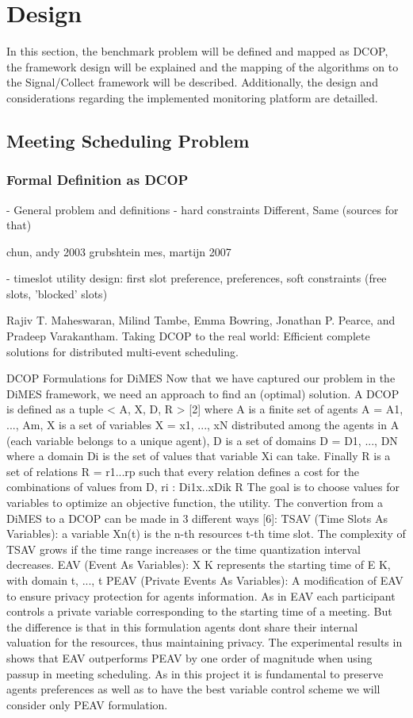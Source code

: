 \chapter{Design}

In this section, the benchmark problem will be defined and mapped as DCOP, the framework design will be explained and the mapping of the algorithms on to the Signal/Collect framework will be described. Additionally, the design and considerations regarding the implemented monitoring platform are detailled.

\section{Meeting Scheduling Problem}

\subsection{Formal Definition as DCOP}

- General problem and definitions
- hard constraints Different, Same (sources for that)

\cite{Chapman2011}
chun, andy 2003
grubshtein
mes, martijn 2007


- timeslot utility design: first slot preference, preferences, soft constraints (free slots, 'blocked' slots)

Rajiv T. Maheswaran, Milind Tambe, Emma Bowring, Jonathan P. Pearce, and Pradeep Varakantham. Taking DCOP
to the real world: Efficient complete solutions for distributed multi-event scheduling.

DCOP Formulations for DiMES Now that we have captured our problem in the DiMES framework, we need an
approach to find an (optimal) solution.
A DCOP is defined as a tuple < A, X, D, R > [2] where A is a finite set of agents A = {A1, ..., Am}, X is a set
of variables X = {x1, ..., xN } distributed among the agents in A (each variable belongs to a unique agent), D is a set of
domains D = {D1, ..., DN } where a domain Di is the set of values that variable Xi can take. Finally R is a set of relations
R = r1...rp such that every relation defines a cost for the combinations of values from D, ri : Di1x..xDik R
The goal is to choose values for variables to optimize an objective function, the utility.
The convertion from a DiMES to a DCOP can be made in 3 different ways [6]:
TSAV (Time Slots As Variables): a variable Xn(t) is the n-th resources t-th time slot.
 The complexity of TSAV grows if the time range increases or the time quantization interval decreases.
EAV (Event As Variables): X
K represents the starting time of E
K, with domain t, ..., t
PEAV (Private Events As Variables): A modification of EAV to ensure privacy protection for agents information.
As in EAV each participant controls a private variable corresponding to the starting time of a meeting. But the
difference is that in this formulation agents dont share their internal valuation for the resources, thus maintaining
privacy. The experimental results in shows that EAV outperforms PEAV by one order of magnitude when using
passup in meeting scheduling. As in this project it is fundamental to preserve agents preferences as well as to have
the best variable control scheme we will consider only PEAV formulation.

